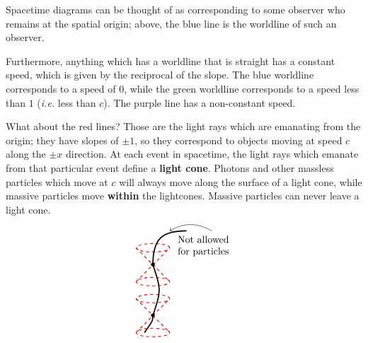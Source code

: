 \documentclass[11pt]{article}
\begin{document}
Spacetime diagrams can be thought of as corresponding to some observer who remains at the spatial origin; above, the blue line is the worldline of such an observer.

Furthermore, anything which has a worldline that is straight has a constant speed, which is given by the reciprocal of the slope. The blue worldline corresponds to a speed of $0$, while the green worldline corresponds to a speed less than $1$ (\textit{i.e.} less than $c$). The purple line has a non-constant speed.

What about the red lines? Those are the light rays which are emanating from the origin; they have slopes of $\pm 1$, so they correspond to objects moving at speed $c$ along the $\pm x$ direction. At each event in spacetime, the light rays which emanate from that particular event define a \textbf{light cone}. Photons and other massless particles which move at $c$ will always move along the surface of a light cone, while massive particles move \textbf{within} the lightcones. Massive particles can never leave a light cone.
\[
\begin{tikzpicture}[scale=0.6]
\draw[-,color=red,dashed,thick] (-1,-1) to (1,1);
\draw[-,color=red,dashed,thick] (-1,1) to (1,-1);
\draw[-,color=red,dashed,thick] (0,1) ellipse (1 and 0.25);
\draw[-,color=red,dashed,thick] (0,-1) ellipse (1 and 0.25);

\node at (0,0) {$\bullet$};

\draw[-,color=red,dashed,thick] (-1,-1+3) to (1,1+3);
\draw[-,color=red,dashed,thick] (-1,1+3) to (1,-1+3);
\draw[-,color=red,dashed,thick] (0,1+3) ellipse (1 and 0.25);
\draw[-,color=red,dashed,thick] (0,-1+3) ellipse (1 and 0.25);

\node at (0,3) {$\bullet$};

\draw[-,very thick] (-0.5,-1) .. controls (0,-0.3) .. (0,0) .. controls (0.5,1.5) .. (0,3) .. controls (0,4.5) and (0.5,5) .. (2,5);

\node at (3,4.5) {Not allowed};
\node at (3,3.75) {for particles};

\draw[->] (3.5,5) to[bend right] (1,5);
\end{tikzpicture}
\]
\end{document}
